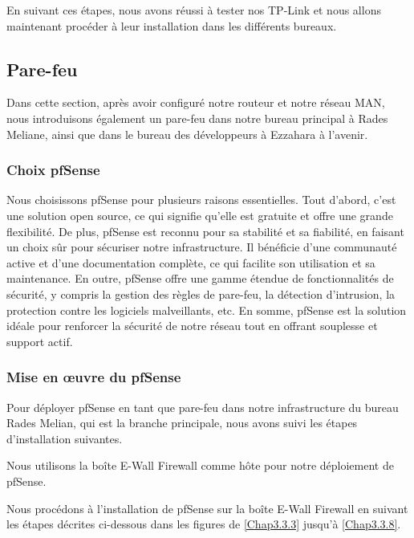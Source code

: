 En suivant ces étapes, nous avons réussi à tester nos TP-Link et nous allons maintenant procéder à leur installation dans les différents bureaux.

\subsection{Pare-feu}

Dans cette section, après avoir configuré notre routeur et notre réseau MAN, nous introduisons également un pare-feu dans notre bureau principal à Rades Meliane, ainsi que dans le bureau des développeurs à Ezzahara à l'avenir.


\subsubsection{Choix pfSense}

Nous choisissons pfSense pour plusieurs raisons essentielles. Tout d'abord, c'est une solution open source, ce qui signifie qu'elle est gratuite et offre une grande flexibilité. De plus, pfSense est reconnu pour sa stabilité et sa fiabilité, en faisant un choix sûr pour sécuriser notre infrastructure. Il bénéficie d'une communauté active et d'une documentation complète, ce qui facilite son utilisation et sa maintenance. En outre, pfSense offre une gamme étendue de fonctionnalités de sécurité, y compris la gestion des règles de pare-feu, la détection d'intrusion, la protection contre les logiciels malveillants, etc. En somme, pfSense est la solution idéale pour renforcer la sécurité de notre réseau tout en offrant souplesse et support actif.


\subsubsection{Mise en œuvre du pfSense}

Pour déployer pfSense en tant que pare-feu dans notre infrastructure du bureau Rades Melian, qui est la branche principale, nous avons suivi les étapes d'installation suivantes.


Nous utilisons la boîte E-Wall Firewall comme hôte pour notre déploiement de pfSense.


Nous procédons à l'installation de pfSense sur la boîte E-Wall Firewall en suivant les étapes décrites ci-dessous dans les figures de \ref{Chap3.3.3} jusqu'à \ref{Chap3.3.8}.


